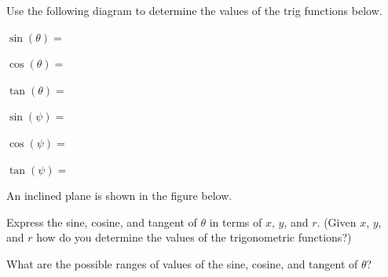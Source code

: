 \begin{problem}
\item Use the following diagram to determine the values of the trig
  functions below.

  \begin{multicols}{2}

      \scalebox{0.35}{}

      \columnbreak

      \begin{subproblem}
      \item $\sin(\theta) = $ \vfill
      \item $\cos(\theta) = $ \vfill
      \item $\tan(\theta) = $ \vfill
      \item $\sin(\psi) = $ \vfill
      \item $\cos(\psi) = $ \vfill
      \item $\tan(\psi) = $ \vfill
      \end{subproblem}
  \end{multicols}

%
%
%
%

\item An inclined plane is shown in the figure below.

  \scalebox{0.35}{}

  \begin{subproblem}
  \item Express the sine, cosine, and tangent of $\theta$ in terms of
    $x$, $y$, and $r$. (Given $x$, $y$, and $r$ how do you determine
    the values of the trigonometric functions?)
    \vfill
  \item What are the possible ranges of values of the sine, cosine, and tangent
    of $\theta$?
    \vspace{8em}
  \end{subproblem}


\end{problem}
